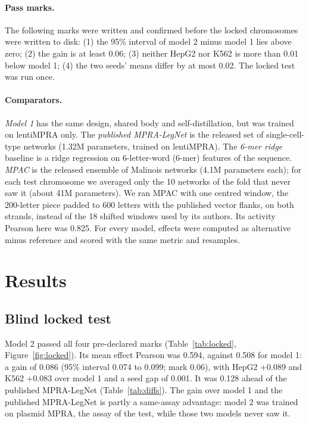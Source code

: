 \documentclass[11pt]{article}
\begin{document}
\paragraph{Pass marks.} The following marks were written and confirmed before the locked chromosomes were written to disk: (1) the 95\% interval of model 2 minus model 1 lies above zero; (2) the gain is at least 0.06; (3) neither HepG2 nor K562 is more than 0.01 below model 1; (4) the two seeds' means differ by at most 0.02. The locked test was run once.

\paragraph{Comparators.} \emph{Model 1} has the same design, shared body and self-distillation, but was trained on lentiMPRA only. The \emph{published MPRA-LegNet} \cite{agarwal2025massively} is the released set of single-cell-type networks (1.32M parameters, trained on lentiMPRA). The \emph{6-mer ridge} baseline is a ridge regression on 6-letter-word (6-mer) features of the sequence. \emph{MPAC} \cite{butts2025identifying} is the released ensemble of Malinois networks \cite{gosai2024machineguided} (4.1M parameters each); for each test chromosome we averaged only the 10 networks of the fold that never saw it (about 41M parameters). We ran MPAC with one centred window, the 200-letter piece padded to 600 letters with the published vector flanks, on both strands, instead of the 18 shifted windows used by its authors. Its activity Pearson here was 0.825. For every model, effects were computed as alternative minus reference and scored with the same metric and resamples.

\section{Results}
\label{sec:results}

\subsection{Blind locked test}
\label{sec:locked}

Model 2 passed all four pre-declared marks (Table~\ref{tab:locked}, Figure~\ref{fig:locked}). Its mean effect Pearson was 0.594, against 0.508 for model 1: a gain of 0.086 (95\% interval 0.074 to 0.099; mark 0.06), with HepG2 +0.089 and K562 +0.083 over model 1 and a seed gap of 0.001. It was 0.128 ahead of the published MPRA-LegNet (Table~\ref{tab:diffs}). The gain over model 1 and the published MPRA-LegNet is partly a same-assay advantage: model 2 was trained on plasmid MPRA, the assay of the test, while those two models never saw it.
\end{document}
